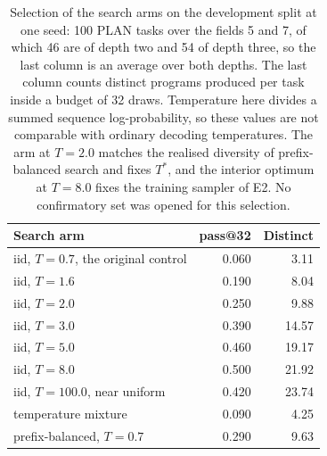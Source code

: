 \begin{table}[!tbh]
\centering\footnotesize\setlength{\tabcolsep}{5pt}
\begin{tabular}{|l|r|r|}
\hline
\textbf{Search arm} & \textbf{pass@32} & \textbf{Distinct} \\
\hline
iid, $T=0.7$, the original control & 0.060 & 3.11 \\ \hline
iid, $T=1.6$ & 0.190 & 8.04 \\ \hline
iid, $T=2.0$ & 0.250 & 9.88 \\ \hline
iid, $T=3.0$ & 0.390 & 14.57 \\ \hline
iid, $T=5.0$ & 0.460 & 19.17 \\ \hline
iid, $T=8.0$ & 0.500 & 21.92 \\ \hline
iid, $T=100.0$, near uniform & 0.420 & 23.74 \\ \hline
temperature mixture & 0.090 & 4.25 \\ \hline
prefix-balanced, $T=0.7$ & 0.290 & 9.63 \\ \hline
\end{tabular}
\caption{Selection of the search arms on the development split at one seed: 100 PLAN
tasks over the fields 5 and 7, of which 46 are of depth two and 54 of depth three, so
the last column is an average over both depths. The last column counts distinct programs produced per task
inside a budget of 32 draws. Temperature here divides a summed sequence
log-probability, so these values are not comparable with ordinary decoding
temperatures. The arm at $T=2.0$ matches the realised diversity of prefix-balanced
search and fixes $T^{*}$, and the interior optimum at $T=8.0$ fixes the training
sampler of E2. No confirmatory set was opened for this selection.}
\label{tab:tempsweep}
\end{table}
